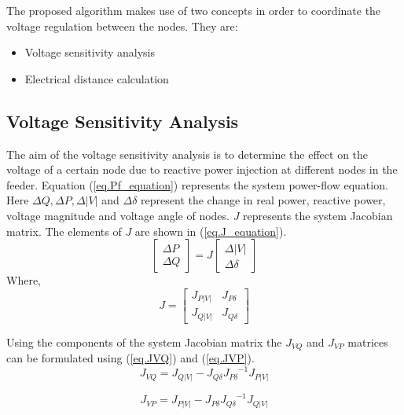 The proposed algorithm makes use of two concepts in order to coordinate the voltage regulation between the nodes. They are:
\begin{itemize}
\item Voltage sensitivity analysis
\item Electrical distance calculation
\end{itemize}

\subsection{Voltage Sensitivity Analysis}
The aim of the voltage sensitivity analysis is to determine the effect on the voltage of a certain node due to reactive power injection at different nodes in the feeder. Equation (\ref{eq.Pf_equation}) represents the system power-flow equation.  Here ${\Delta Q}, {\Delta P}, {\Delta |V|}$ and ${\Delta \delta}$ represent the change in real power, reactive power, voltage magnitude and voltage angle of nodes. $J$ represents the system Jacobian matrix. The elements of $J$ are shown in (\ref{eq.J_equation}).
\begin{equation}\label{eq.Pf_equation}
\begin{bmatrix}
{\Delta P}\\ {\Delta Q}
\end{bmatrix} =J\begin{bmatrix}
{\Delta|V|} \\ {\Delta\delta}
\end{bmatrix}
\end{equation}  
Where,
\begin{equation}\label{eq.J_equation}
    J = \begin{bmatrix}
{J_{P|V|}} & {J_{P\delta}}\\ {J_{Q|V|}} & {J_{Q\delta}}
\end{bmatrix}
\end{equation}

Using the components of the system Jacobian matrix the $J_{VQ}$ and $J_{VP}$ matrices can be formulated using (\ref{eq.JVQ}) and (\ref{eq.JVP}).
\begin{equation}\label{eq.JVQ}
    {J_{VQ}} = {J_{Q|V|}}-{J_{Q\delta}}{J_{P\delta}}^{-1}{J_{P|V|}}
\end{equation}

\begin{equation}\label{eq.JVP}
    {J_{VP}}={J_{P|V|}}-{J_{P\delta}}{J_{Q\delta}}^{-1}{J_{Q|V|}}
\end{equation}

